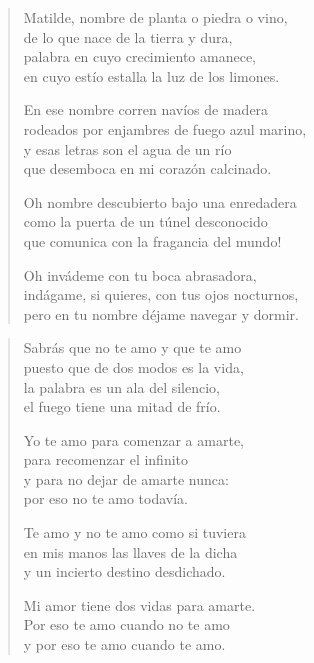 \documentclass[12pt]{article}
\begin{document}
\clearpage
{}
\begin{verse}

Matilde, nombre de planta o piedra o vino,\\
de lo que nace de la tierra y dura,\\
palabra en cuyo crecimiento amanece,\\
en cuyo estío estalla la luz de los limones.  

En ese nombre corren navíos de madera\\
rodeados por enjambres de fuego azul marino,\\
y esas letras son el agua de un río\\
que desemboca en mi corazón calcinado.  

Oh nombre descubierto bajo una enredadera\\
como la puerta de un túnel desconocido\\
que comunica con la fragancia del mundo!  

Oh invádeme con tu boca abrasadora,\\
indágame, si quieres, con tus ojos nocturnos,\\
pero en tu nombre déjame navegar y dormir.  

\end{verse}

\clearpage
{}
\begin{verse}

Sabrás que no te amo y que te amo\\
puesto que de dos modos es la vida,\\
la palabra es un ala del silencio,\\
el fuego tiene una mitad de frío.  

Yo te amo para comenzar a amarte,\\
para recomenzar el infinito\\
y para no dejar de amarte nunca:\\
por eso no te amo todavía.  

Te amo y no te amo como si tuviera\\
en mis manos las llaves de la dicha\\
y un incierto destino desdichado.  

Mi amor tiene dos vidas para amarte.\\
Por eso te amo cuando no te amo\\
y por eso te amo cuando te amo.  

\end{verse}
\end{document}
